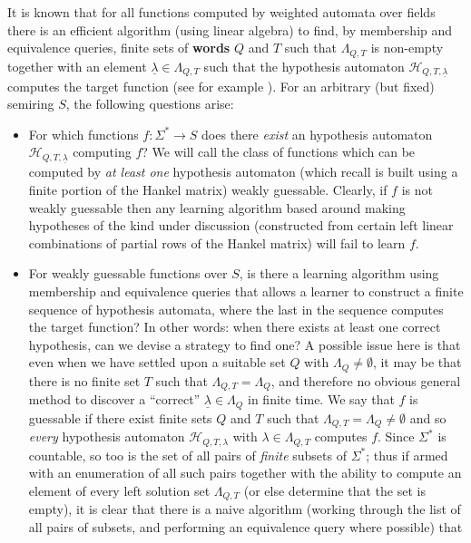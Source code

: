 \documentclass{lmcs}
\numberwithin{theorem}{section}
\begin{document}
It is known that for all functions computed by weighted automata over fields there is an efficient algorithm (using linear algebra) to find, by membership and equivalence queries, finite
sets of \textbf{words}
$Q$ and $T$ such that
$\Lambda_{Q,T}$ is non-empty
together with an  element 
$\underline{\lambda}
\in \Lambda_{Q,T}$  such that the hypothesis automaton $\mathcal{H}_{Q,T,\underline{\lambda}}$ computes the target function (see for example \cite{BV96}). For an arbitrary (but fixed) semiring $S$, the following questions arise:
\begin{itemize}
\item For which functions $f: \Sigma^* \rightarrow S$ does there \emph{exist} an hypothesis automaton $\mathcal{H}_{Q, T, \underline{\lambda}}$ computing $f$? We will call the class of functions which can be computed by \emph{at least one} hypothesis automaton (which recall is built using a finite portion of the Hankel matrix) weakly guessable. Clearly, if $f$ is not weakly guessable then any learning algorithm based around making hypotheses of the kind under discussion (constructed from certain left linear combinations of partial rows of the Hankel matrix) will fail to learn $f$. 
\item For weakly guessable functions over $S$, is there a learning algorithm using membership and equivalence queries that allows a learner to construct a finite sequence of hypothesis automata, where the last in the sequence computes the target function?
In other words: when there exists at least one correct hypothesis, can we devise a strategy to find one? A possible issue here is that even when we have settled upon a suitable set $Q$ with $\Lambda_Q \neq \emptyset$, it may be that there is no finite set $T$ such that $\Lambda_{Q, T}= \Lambda_Q$, and therefore no obvious general method to discover a ``correct'' $\underline{\lambda} \in \Lambda_Q$  in finite time. We say that $f$ is guessable if there exist finite sets $Q$ and $T$ such that $\Lambda_{Q,T} = \Lambda_Q \neq \emptyset$ and so \emph{every} hypothesis automaton $\mathcal{H}_{Q, T, \lambda}$ with $\lambda \in \Lambda_{Q,T}$ computes $f$. Since $\Sigma^*$ is countable,
so too is the set of all pairs of \emph{finite} subsets of $\Sigma^*$; thus if armed with an enumeration of all such pairs together with the ability to compute an element of every left solution set $\Lambda_{Q,T}$  (or else determine that the set is empty), it is clear that there is a naive algorithm (working through the list of all pairs of subsets, and performing an equivalence query where possible) that

\end{itemize}
\end{document}
